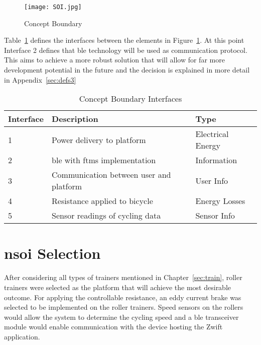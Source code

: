\begin{figure}[H]
	\begin{center}
		\texttt{[image: SOI.jpg]}
		\caption{Concept Boundary}
		\label{fig:soi}
	\end{center}
\end{figure}

Table~\ref{tab:links} defines the interfaces between the elements in Figure~\ref{fig:soi}. At this point Interface 2 defines that \ac{ble} technology will be used as communication protocol. This aims to achieve a more robust solution that will allow for far more development potential in the future and the decision is explained in more detail in Appendix~\ref{sec:defs3}

\begin{table}[H]
	\renewcommand{\arraystretch}{\tablestretch}
	\centering
	\caption{Concept Boundary Interfaces}
	\begin{tabularx}{\textwidth}{p{1.5cm} X p{3.5cm}}
		\toprule
		Interface & Description                             & Type              \\
		\midrule
		1         & Power delivery to platform              & Electrical Energy \\
		2         & \ac{ble} with \ac{ftms} implementation  & Information       \\
		3         & Communication between user and platform & User Info         \\
		4         & Resistance applied to bicycle           & Energy Losses     \\
		5         & Sensor readings of cycling data         & Sensor Info       \\
		\bottomrule
	\end{tabularx}
	\label{tab:links}
\end{table}

\section{\ac{nsoi} Selection}

After considering all types of trainers mentioned in Chapter~\ref{sec:train}, roller trainers were selected as the platform that will achieve the most desirable outcome. For applying the controllable resistance, an eddy current brake was selected to be implemented on the roller trainers. Speed sensors on the rollers would allow the system to determine the cycling speed and a \ac{ble} transceiver module would enable communication with the device hosting the Zwift application.

